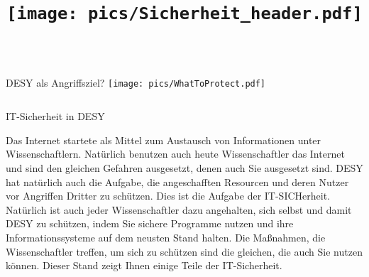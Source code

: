 \documentclass[final]{beamer}
\title{\texttt{[image: pics/Sicherheit\_header.pdf]}} %
\newlength{\twocolwid}
\begin{document}

\setlength{\belowcaptionskip}{2ex} %
\setlength\belowdisplayshortskip{2ex} %

\begin{frame}[t] %

\begin{columns}[b]

\begin{column}{0.95\textwidth}

\begin{alertblock}{DESY als Angriffsziel?}
\texttt{[image: pics/WhatToProtect.pdf]}
\end{alertblock}
\end{column}
\end{columns}

\begin{columns}[t] %

\begin{column}{0.95\textwidth} %


\begin{block}{IT-Sicherheit in DESY}

Das Internet startete als Mittel zum Austausch von Informationen
unter Wissenschaftlern. Natürlich benutzen auch heute Wissenschaftler das Internet und sind den gleichen
Gefahren ausgesetzt, denen auch Sie ausgesetzt sind. DESY hat natürlich auch die Aufgabe, die angeschafften
Resourcen und deren Nutzer vor Angriffen Dritter zu schützen. Dies ist die Aufgabe der IT-SICHerheit. 
Natürlich ist auch jeder Wissenschaftler dazu angehalten, sich selbst und damit DESY zu schützen, indem Sie sichere Programme nutzen und ihre Informationssysteme auf dem neusten Stand halten. Die Ma{\ss}nahmen, die Wissenschaftler treffen, um sich zu schützen sind die gleichen, die auch Sie nutzen können.
Dieser Stand zeigt Ihnen einige Teile der IT-Sicherheit.


\end{block}
\end{column}
\end{columns}
\end{frame}
\end{document}
